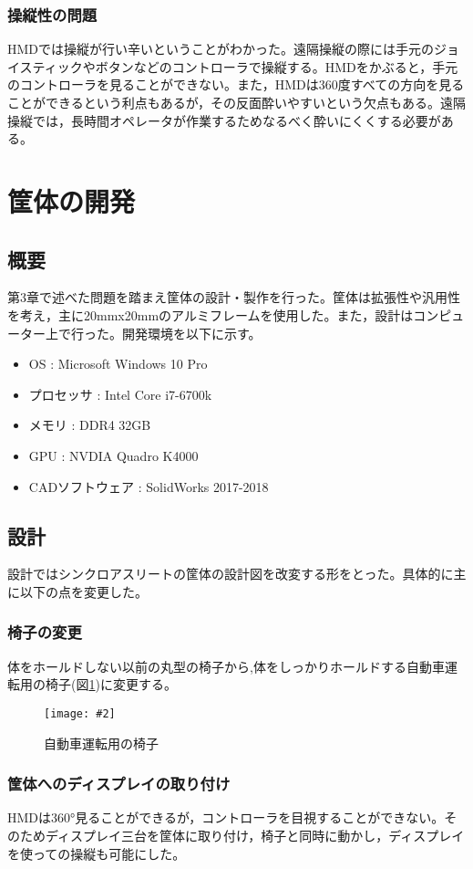 \documentclass[10pt,a4paper]{jsarticle}
\newcommand{\figuref}[1]{図\ref{#1}}
\newcommand{\fig}[4][width=\textwidth]{
    \begin{figure}[!h]
    \begin{center}
    \texttt{[image: \#2]}
    \caption{#3}
    \label{#4}
    \vspace*{-1cm}
    \end{center}
    \end{figure}
}
\begin{document}
\subsubsection{操縦性の問題}
HMDでは操縦が行い辛いということがわかった。遠隔操縦の際には手元のジョイスティックやボタンなどのコントローラで操縦する。HMDをかぶると，手元のコントローラを見ることができない。また，HMDは360度すべての方向を見ることができるという利点もあるが，その反面酔いやすいという欠点もある。遠隔操縦では，長時間オペレータが作業するためなるべく酔いにくくする必要がある。

\clearpage

\section{筐体の開発}
\subsection{概要}
第3章で述べた問題を踏まえ筐体の設計・製作を行った。筐体は拡張性や汎用性を考え，主に20mmx20mmのアルミフレームを使用した。また，設計はコンピューター上で行った。開発環境を以下に示す。
\begin{itemize}
    \item OS : Microsoft Windows 10 Pro
    \item プロセッサ : Intel Core i7-6700k
    \item メモリ : DDR4 32GB
    \item GPU : NVDIA Quadro K4000
    \item CADソフトウェア : SolidWorks 2017-2018
\end{itemize}

\subsection{設計}
設計ではシンクロアスリートの筐体の設計図を改変する形をとった。具体的に主に以下の点を変更した。

\subsubsection{椅子の変更}
体をホールドしない以前の丸型の椅子から,体をしっかりホールドする自動車運転用の椅子(\figuref{recaro})に変更する。
\fig[width=9cm]{image/test_field.jpg}{自動車運転用の椅子}{recaro}

\subsubsection{筐体へのディスプレイの取り付け}
HMDは360°見ることができるが，コントローラを目視することができない。そのためディスプレイ三台を筐体に取り付け，椅子と同時に動かし，ディスプレイを使っての操縦も可能にした。
\end{document}
